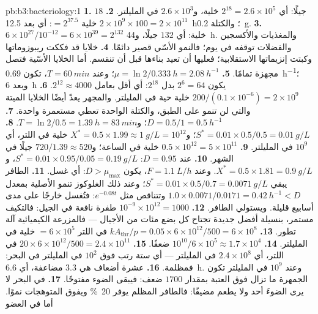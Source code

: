 \begin{solution}{pb:b3:bacteriology:1}
\textbf{1.} $18$ جيلًا: أي $2^{18} = 2.6\times 10^{5}$ خلية،
و$2.6\times 10^{3}$ في المليلتر.
\textbf{2.} $2\times 10^{9}\times 100 = 2\times 10^{11}$ خلية $=
2^{37.5}$: أي بعد \qty{12.5}{h}؛ والكتلة \qty{0.2}{g}.
\textbf{3.} $6\times 10^{27}/10^{-12} = 6\times 10^{39} = 2^{132}$ خلية:
أي $132$ جيلًا، و\qty{44}{h}. والمغذيات والأكسجين والفضلات توقفه
في يوم؛ فالنمو الأسّي قصير دائمًا.
\textbf{4.} خلايا  قد فككت ريبوزوماتها وكبتت
إنزيماتها الاستقلابية؛ فعليها أن تعيد بناءها قبل أن تنقسم.
أما الخلايا الأسّية فتصل مجهزة تمامًا.
\textbf{5.} $\mu = \ln 2/\qty{0.333}{h} = \qty{2.08}{h^{-1}}$؛ وعند $T =
\qty{60}{min}$، تكون \qty{0.69}{h^{-1}}؛ وبعد \qty{6}{h} يكون $2^{6} = 64$
بدل $2^{18}$: أي أقل بعامل $2^{12} \approx 4000$.
\textbf{6.} $200/(0.1\times 10^{-6}) = 2\times 10^{9}$ خلية حية في
المليلتر. والمجهر يعدّ أيضًا الخلايا الميتة والتي لن تنمو
على الطبق، والكتلة الواحدة تعطي مستعمرة واحدة.
\textbf{7.} $D = 0.5/1 = \qty{0.5}{h^{-1}}$؛ و$T = \ln 2/0.5 =
\qty{1.39}{h} = \qty{83}{min}$.
\textbf{8.} $S^{*} = 0.01\times 0.5/0.5 = \qty{0.01}{g/L}$؛ و$X^{*} =
0.5\times 1.99 \approx \qty{1}{g/L} = 10^{12}$ خلية في اللتر، أي $10^{9}$
في المليلتر.
\textbf{9.} $0.5\times 10^{12} = 5\times 10^{11}$ خلية في الساعة؛ و$720/1.39
\approx 520$ جيلًا في الشهر.
\textbf{10.} عند $D = 0.95$: $S^{*} = 0.01\times 0.95/0.05 = \qty{0.19}{g/L}$،
و$X^{*} = 0.5\times 1.81 = \qty{0.9}{g/L}$. وعند $F = \qty{1.1}{L/h}$، يكون $D
> \mu_{\max}$: أي غسل.
\textbf{11.} الطافر يبقي $S^{*} = 0.01\times 0.5/0.7 = \qty{0.0071}{g/L}$؛
وعند ذلك الغلوكوز تنمو الأصلية بمعدل $1.0\times 0.0071/0.0171 =
\qty{0.42}{h^{-1}} < D$ وتتناقص مثل $e^{-0.08t}$: فتُغسل خارجًا على مدى
أسابيع قليلة. ويستولي الطافر.
\textbf{12.} $10^{-9}\times 10^{12} = 1000$ طفرة نافعة في
الجيل: فالتكيف مستمر، بنسيلة أفضل جديدة
تجتاح كل بضع مئات من الأجيال --- فالمزرعة الكيميائية
آلة تطور.
\textbf{13.} $kA_{\text{thr}}/p = 0.05\times 6\times 10^{12}/500 =
6\times 10^{8}$ في اللتر $= 6\times 10^{5}$ خلية في المليلتر.
\textbf{14.} $10^{10}/6\times 10^{5} \approx 1.7\times 10^{4}$ ضعفًا.
\textbf{15.} $20\times 6\times 10^{12}/500 = 2.4\times 10^{11}$ في اللتر،
أي $2.4\times 10^{8}$ في المليلتر --- أي ستة رتب فوق
$10^{2}$ في المليلتر في البحر: فمظلمة.
\textbf{16.} عشرة أضعاف هي $3.3$ مضاعفة، أي \qty{6.6}{h}. وعند $10^{9}$ في المليلتر
تكون الجمهرة ما تزال فوق العتبة بمقدار $1700$ ضعف: فيبقى الضوء
مفتوحًا.
\textbf{17.} في البحر لا يرى الضوءَ أحد ولا يطعم مضيفًا: فالطافر
المظلم يوفر \qty{20}{\%} ويفوق المتوهجات نموًا. أما في العضو

\end{solution}
